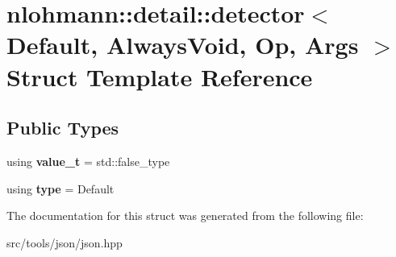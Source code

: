 \hypertarget{structnlohmann_1_1detail_1_1detector}{}\section{nlohmann\+:\+:detail\+:\+:detector$<$ Default, Always\+Void, Op, Args $>$ Struct Template Reference}
\label{structnlohmann_1_1detail_1_1detector}
\subsection*{Public Types}
\begin{DoxyCompactItemize}
\item 
\mbox{\label{structnlohmann_1_1detail_1_1detector_a5a132aab543d1706e2439268faf8d487}} 
using {\bfseries value\+\_\+t} = std\+::false\+\_\+type
\item 
\mbox{\label{structnlohmann_1_1detail_1_1detector_a0cd69423587748bf3d3d702cc7b7c2ce}} 
using {\bfseries type} = Default
\end{DoxyCompactItemize}


The documentation for this struct was generated from the following file\+:\begin{DoxyCompactItemize}
\item 
src/tools/json/json.\+hpp\end{DoxyCompactItemize}
